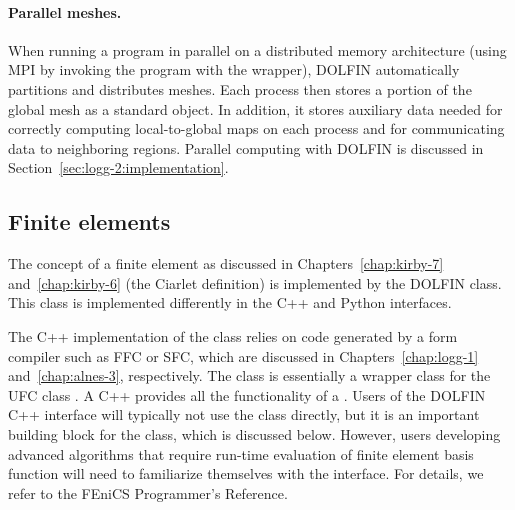 \paragraph{Parallel meshes.}

When running a program in parallel on a distributed memory architecture
(using MPI by invoking the program with the  wrapper),
DOLFIN automatically partitions and distributes meshes. Each process
then stores a portion of the global mesh as a standard 
object. In addition, it stores auxiliary data needed for correctly
computing local-to-global maps on each process and for communicating
data to neighboring regions. Parallel computing with DOLFIN is discussed
in Section~\ref{sec:logg-2:implementation}.

\subsection{Finite elements}

The concept of a finite element as discussed in
Chapters~\ref{chap:kirby-7} and~\ref{chap:kirby-6} (the Ciarlet
definition) is implemented by the DOLFIN  class. This
class is implemented differently in the C++ and Python interfaces.

The C++ implementation of the  class relies on
code generated by a form compiler such as FFC or SFC, which are discussed
in Chapters~\ref{chap:logg-1} and~\ref{chap:alnes-3}, respectively. The
class  is essentially a wrapper class for the UFC class
. A C++  provides all
the functionality of a . Users of the DOLFIN C++
interface will typically not use the  class directly,
but it is an important building block for the  class, which
is discussed below. However, users developing advanced algorithms that
require run-time evaluation of finite element basis function will need
to familiarize themselves with the  interface. For
details, we refer to the FEniCS Programmer's Reference.

